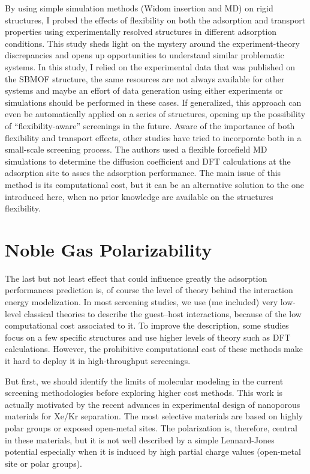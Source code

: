 \documentclass[main]{subfiles}
\begin{document}
By using simple simulation methods (Widom insertion and MD) on rigid structures, I probed the effects of flexibility on both the adsorption and transport properties using experimentally resolved structures in different adsorption conditions. This study sheds light on the mystery around the experiment-theory discrepancies and opens up opportunities to understand similar problematic systems. In this study, I relied on the experimental data that was published on the SBMOF structure, the same resources are not always available for other systems and maybe an effort of data generation using either experiments or simulations should be performed in these cases. If generalized, this approach can even be automatically applied on a series of structures, opening up the possibility of ``flexibility-aware'' screenings in the future. Aware of the importance of both flexibility and transport effects, other studies have tried to incorporate both in a small-scale screening process.\autocite{Stanton_2022} The authors used a flexible forcefield MD simulations to determine the diffusion coefficient and DFT calculations at the adsorption site to asses the adsorption performance. The main issue of this method is its computational cost, but it can be an alternative solution to the one introduced here, when no prior knowledge are available on the structures flexibility. 

\section{Noble Gas Polarizability}

The last but not least effect that could influence greatly the adsorption performances prediction is, of course the level of theory behind the interaction energy modelization. In most screening studies, we use (me included) very low-level classical theories to describe the guest--host interactions, because of the low computational cost associated to it. To improve the description, some studies focus on a few specific structures and use higher levels of theory such as DFT calculations. However, the prohibitive computational cost of these methods make it hard to deploy it in high-throughput screenings. 

But first, we should identify the limits of molecular modeling in the current screening methodologies before exploring higher cost methods. This work is actually motivated by the recent advances in experimental design of nanoporous materials for Xe/Kr separation. The most selective materials are based on highly polar groups or exposed open-metal sites.\autocite{Li_2019,Pei_2022} The polarization is, therefore, central in these materials, but it is not well described by a simple Lennard-Jones potential especially when it is induced by high partial charge values (open-metal site or polar groups). 
\end{document}
